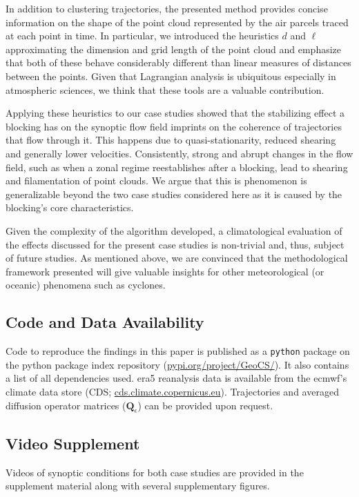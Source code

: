 In addition to clustering trajectories, the presented method provides concise information on the shape of the point cloud represented by the air parcels traced at each point in time. In particular, we introduced the heuristics $d$ and $\ell$ approximating the dimension and grid length of the point cloud and emphasize that both of these behave considerably different than linear measures of distances between the points. Given that Lagrangian analysis is ubiquitous especially in atmospheric sciences, we think that these tools are a valuable contribution.

Applying these heuristics to our case studies showed that the stabilizing effect a blocking has on the synoptic flow field imprints on the coherence of trajectories that flow through it. This happens due to quasi-stationarity, reduced shearing and generally lower velocities. Consistently, strong and abrupt changes in the flow field, such as when a zonal regime reestablishes after a blocking, lead to shearing and filamentation of point clouds. We argue that this is phenomenon is generalizable beyond the two case studies considered here as it is caused by the blocking's core characteristics.

Given the complexity of the algorithm developed, a climatological evaluation of the effects discussed for the present case studies is non-trivial and, thus, subject of future studies. As mentioned above, we are convinced that the methodological framework presented will give valuable insights for other meteorological (or oceanic) phenomena such as cyclones.

\subsection*{Code and Data Availability}
Code to reproduce the findings in this paper is published as a \texttt{python} package on the python package index repository (\url{pypi.org/project/GeoCS/}). It also contains a list of all dependencies used. \gls{era5} reanalysis data is available from the \gls{ecmwf}'s climate data store (CDS; \url{cds.climate.copernicus.eu}). Trajectories and averaged diffusion operator matrices ($\mathbf{Q}_{\epsilon}$) can be provided upon request.

\subsection*{Video Supplement}
Videos of synoptic conditions for both case studies are provided in the supplement material along with several supplementary figures. %

